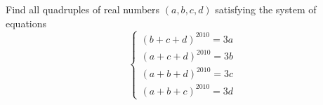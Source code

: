 Find all quadruples of real numbers $(a,b,c,d)$ satisfying the system of equations\[\begin{cases}(b+c+d)^{2010}=3a\\ (a+c+d)^{2010}=3b\\ (a+b+d)^{2010}=3c\\ (a+b+c)^{2010}=3d\end{cases}\]